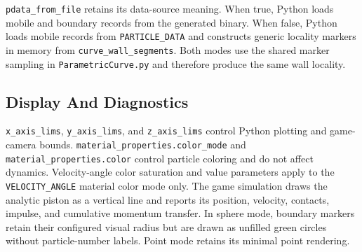 \texttt{pdata\_from\_file} retains its data-source meaning.  When true,
Python loads mobile and boundary records from the generated binary.  When
false, Python loads mobile records from \texttt{PARTICLE\_DATA} and constructs
generic locality markers in memory from \texttt{curve\_wall\_segments}.  Both
modes use the shared marker sampling in
\texttt{ParametricCurve.py} and therefore produce the same wall locality.

\subsection{Display And Diagnostics}

\texttt{x\_axis\_lims}, \texttt{y\_axis\_lims}, and
\texttt{z\_axis\_lims} control Python plotting and game-camera bounds.
\texttt{material\_properties.color\_mode} and
\texttt{material\_properties.color} control particle coloring and do not
affect dynamics.  Velocity-angle color saturation and value parameters apply
to the \texttt{VELOCITY\_ANGLE} material color mode only.
The game simulation draws the analytic piston as a vertical line and reports
its position, velocity, contacts, impulse, and cumulative momentum transfer.
In sphere mode, boundary markers retain their configured visual radius but
are drawn as unfilled green circles without particle-number labels.  Point
mode retains its minimal point rendering.
